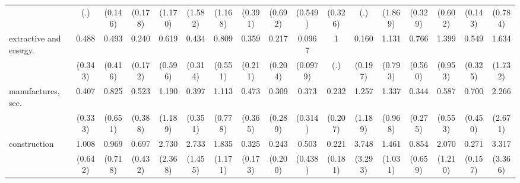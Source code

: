 {\begin{tabular}{l*{16}{c}}
                    &         (.)         &     (0.146)         &     (0.178)         &     (1.170)         &     (1.582)         &     (1.168)         &     (0.391)         &     (0.692)         &     (0.549)         &     (0.326)         &         (.)         &     (1.869)         &     (0.329)         &     (0.602)         &     (0.143)         &     (0.784)         \\
[1em]
extractive and energy.&       0.488         &       0.493         &       0.240\sym{*}  &       0.619         &       0.434         &       0.809         &       0.359         &       0.217         &      0.0967\sym{*}  &           1         &       0.160         &       1.131         &       0.766         &       1.399         &       0.549         &       1.634         \\
                    &     (0.343)         &     (0.416)         &     (0.172)         &     (0.596)         &     (0.314)         &     (0.551)         &     (0.211)         &     (0.204)         &    (0.0979)         &         (.)         &     (0.197)         &     (0.793)         &     (0.560)         &     (0.953)         &     (0.325)         &     (1.732)         \\
[1em]
manufactures, sec.  &       0.407         &       0.825         &       0.523         &       1.190         &       0.397         &       1.113         &       0.473         &       0.309         &       0.373         &       0.232         &       1.257         &       1.337         &       0.344         &       0.587         &       0.700         &       2.266         \\
                    &     (0.333)         &     (0.651)         &     (0.388)         &     (1.189)         &     (0.351)         &     (0.778)         &     (0.365)         &     (0.289)         &     (0.314)         &     (0.207)         &     (1.189)         &     (0.968)         &     (0.275)         &     (0.553)         &     (0.450)         &     (2.671)         \\
[1em]
construction        &       1.008         &       0.969         &       0.697         &       2.730         &       2.733         &       1.835         &       0.325\sym{*}  &       0.243         &       0.503         &       0.221         &       3.748         &       1.461         &       0.854         &       2.070         &       0.271\sym{*}  &       3.317         \\
                    &     (0.642)         &     (0.718)         &     (0.432)         &     (2.368)         &     (1.455)         &     (1.171)         &     (0.173)         &     (0.200)         &     (0.438)         &     (0.181)         &     (3.293)         &     (1.031)         &     (0.659)         &     (1.210)         &     (0.157)         &     (3.366)         \\

\end{tabular}}
